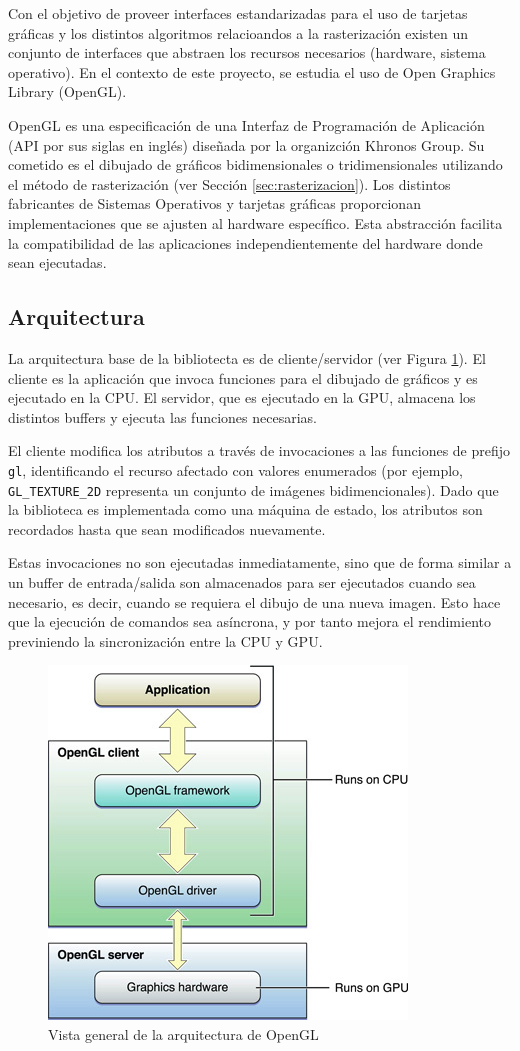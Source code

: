Con el objetivo de proveer interfaces estandarizadas para el uso de tarjetas gráficas y los distintos algoritmos relacioandos a la rasterización existen un conjunto de interfaces que abstraen los recursos necesarios (hardware, sistema operativo). En el contexto de este proyecto, se estudia el uso de Open Graphics Library (OpenGL).

OpenGL es una especificación de una Interfaz de Programación de Aplicación (API por sus siglas en inglés) diseñada por la organizción Khronos Group. Su cometido es el dibujado de gráficos bidimensionales o tridimensionales utilizando el método de rasterización (ver Sección \ref{sec:rasterizacion}). Los distintos fabricantes de Sistemas Operativos y tarjetas gráficas proporcionan implementaciones que se ajusten al hardware específico. Esta abstracción facilita la compatibilidad de las aplicaciones independientemente del hardware donde sean ejecutadas.

\subsection{Arquitectura}
La arquitectura base de la bibliotecta es de cliente/servidor (ver Figura \ref{img:gpucpugl}). El cliente es la aplicación que invoca funciones para el dibujado de gráficos y es ejecutado en la CPU. El servidor, que es ejecutado en la GPU, almacena los distintos buffers y ejecuta las funciones necesarias.

El cliente modifica los atributos a través de invocaciones a las funciones de prefijo \verb|gl|, identificando el recurso afectado con valores enumerados (por ejemplo, \verb|GL_TEXTURE_2D| representa un conjunto de imágenes bidimencionales). Dado que la biblioteca es implementada como una máquina de estado, los atributos son recordados hasta que sean modificados nuevamente.

Estas invocaciones no son ejecutadas inmediatamente, sino que de forma similar a un buffer de entrada/salida son almacenados para ser ejecutados cuando sea necesario, es decir, cuando se requiera el dibujo de una nueva imagen. Esto hace que la ejecución de comandos sea asíncrona, y por tanto mejora el rendimiento previniendo la sincronización entre la CPU y GPU.

\vspace{5mm}
\begin{figure}[h]
	\centering
	\includegraphics[width=.4\linewidth]{assets/cpu_gpu}
	\caption{Vista general de la arquitectura de OpenGL}
	\label{img:gpucpugl}
 \end{figure}

